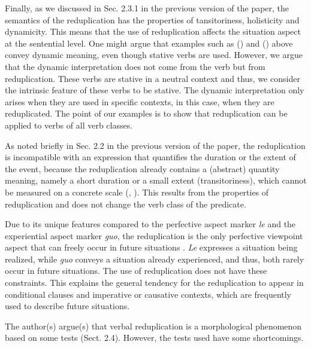 \documentclass[fleqn,twoside]{article}
\begin{document}
{Finally, as we discussed in Sec. 2.3.1 in the previous version of the paper, the semantics of the reduplication has the properties of tansitoriness, holisticity and dynamicity.
This means that the use of reduplication affects the situation aspect at the sentential level.
One might argue that examples such as () and () above convey dynamic meaning, even though stative verbs are used.
However, we argue that the dynamic interpretation does not come from the verb but from reduplication.
These verbs are stative in a neutral context and thus, we consider the intrinsic feature of these verbs to be stative.
The dynamic interpretation only arises when they are used in specific contexts, in this case, when they are reduplicated.
The point of our examples is to show that reduplication can be applied to verbs of all verb classes.

As noted briefly in Sec. 2.2 in the previous version of the paper,
the reduplication is incompatible with an expression that quantifies the duration or the extent of the event,
 because the reduplication already contains a (abstract) quantity meaning, namely a short duration or a small extent (transitoriness),
 which cannot be measured on a concrete scale (\citealt[155]{XiaoMcEnery2004}, \citealt[333]{SuiHu2016}).
 This results from the properties of reduplication and does not change the verb class of the predicate.
 
Due to its unique features compared to the perfective aspect marker \textit{le} and the experiential aspect marker \textit{guo},
the reduplication is the only perfective viewpoint aspect that can freely occur in future situations \citep[156--157]{XiaoMcEnery2004}.
\textit{Le} expresses a situation being realized, 
while \textit{guo} conveys a situation already experienced,
and thus, both rarely occur in future situations.
The use of reduplication does not have these constraints.
This explains the general tendency for the reduplication to appear in conditional clauses and imperative or causative contexts,
which are frequently used to describe future situations.
 
The author(s) argue(s) that verbal reduplication is a morphological phenomenon based on some tests (Sect. 2.4). However, the tests used have some shortcomings.

}
\end{document}
